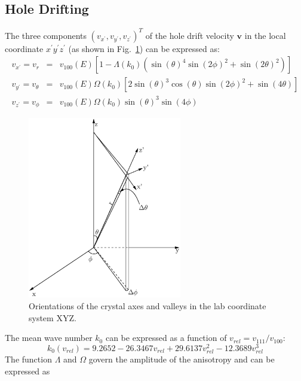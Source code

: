 \subsection{Hole Drifting}
\label{sec:hole}
The three components $(v_{x^{\prime}}, v_{y^{\prime}}, v_{z^{\prime}})^{T}$ of the hole drift velocity $\mathbf{v}$ in the local coordinate $x^{\prime}y^{\prime}z^{\prime}$ (as shown in Fig.~\ref{fig:vsphere}) can be expressed as:
\begin{equation}
  \label{eq:vsphere}
  \begin{array}{rcl}
   v_{x^{\prime}} = v_{r} &=& v_{100}(E)[1-\Lambda(k_{0})(\sin(\theta)^{4}\sin(2\phi)^{2} + \sin(2\theta)^{2})]\\
   v_{y^{\prime}} = v_{\theta} &=& v_{100}(E)\Omega(k_{0})[2\sin(\theta)^{3}\cos(\theta)\sin(2\phi)^{2} + \sin(4\theta)]\\
    v_{z^{\prime}} = v_{\phi} &=& v_{100}(E)\Omega(k_{0})\sin(\theta)^{3}\sin(4\phi)
  \end{array}
\end{equation}
\begin{figure}[tbhp]
  \centering
  \includegraphics[width=0.6\textwidth]{vsphere.eps}  
  \caption{Orientations of the crystal axes and valleys in the lab
coordinate system XYZ.}
  \label{fig:vsphere}
\end{figure}
The mean wave number $k_{0}$ can be expressed as a function of $v_{rel} = v_{111}/v_{100}$:
\begin{equation}
  \label{eq:k0}
   k_{0}(v_{rel}) = 9.2652 - 26.3467v_{rel} + 29.6137v_{rel}^{2} - 12.3689v_{rel}^{3}
\end{equation}
The function $\Lambda$ and $\Omega$ govern the amplitude of the anisotropy and can be expressed as
